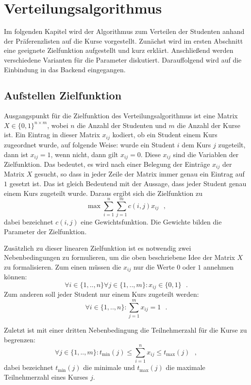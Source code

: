 \chapter{Verteilungsalgorithmus}
\label{chapter:algorithm}
    Im folgenden Kapitel wird der Algorithmus zum Verteilen der Studenten anhand der Präferenzlisten auf die Kurse vorgestellt.
    Zunächst wird im ersten Abschnitt eine geeignete Zielfunktion aufgestellt und kurz erklärt.
    Anschließend werden verschiedene Varianten für die Parameter diskutiert.
    Darauffolgend wird auf die Einbindung in das Backend eingegangen.
    
    \section{Aufstellen Zielfunktion}
        Ausgangspunkt für die Zielfunktion des Verteilungsalgorithmus ist eine Matrix $ X \in \{0,1\}^{n \times m}$, wobei $ n $ die Anzahl der Studenten und $ m $ die Anzahl der Kurse ist.
        Ein Eintrag in dieser Matrix $ x_{ij} $ kodiert, ob ein Student einem Kurs zugeordnet wurde, auf folgende Weise:
        wurde ein Student $ i $ dem Kurs $ j $ zugeteilt, dann ist $ x_{ij} = 1 $, wenn nicht, dann gilt $ x_{ij} = 0 $. 
        Diese $ x_{ij} $ sind die Variablen der Zielfunktion.
        Das bedeutet, es wird nach einer Belegung der Einträge $ x_{ij} $ der Matrix $ X $ gesucht, so dass in jeder Zeile der Matrix immer genau ein Eintrag auf $ 1 $ gesetzt ist.
        Das ist gleich Bedeutend mit der Aussage, dass jeder Student genau einem Kurs zugeteilt wurde.
        Daraus ergibt sich die Zielfunktion zu
            $$ \max \sum_{i=1}^{n} \sum_{j=1}^{m} c(i,j)x_{ij}  ~~~,$$
        dabei bezeichnet $ c(i,j) $ eine Gewichtsfunktion.
        Die Gewichte bilden die Parameter der Zielfunktion.
        
        Zusätzlich zu dieser linearen Zielfunktion ist es notwendig zwei Nebenbedingungen zu formulieren, um die oben beschriebene Idee der Matrix $ X $ zu formalisieren.
        Zum einen müssen die $ x_{ij} $ nur die Werte $ 0 $ oder $ 1 $ annehmen können:
            $$\forall {i \in \{1,..,n\}} \forall {j \in \{1,..,m\}}:  x_{ij} \in \{0,1\} ~~~.$$
        Zum anderen soll jeder Student nur einem Kurs zugeteilt werden:
            $$ \forall {i \in \{1,..,n\}}: \sum_{j=1}^{m} x_{ij} = 1 ~~~.$$
        
        Zuletzt ist mit einer dritten Nebenbedingung die Teilnehmerzahl für die Kurse zu begrenzen:
             $$ \forall {j \in \{1,..,m\}}: t_{\min}(j) \leq \sum_{i=1}^{n} x_{ij} \leq t_{\max}(j) ~~~,$$
        dabei bezeichnet $ t_{\min}(j) $ die minimale und $ t_{\max}(j) $ die maximale Teilnehmerzahl eines Kurses $ j $.
        
